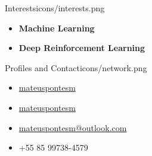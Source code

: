\documentclass{thepurplecv}
\begin{document}
\begin{purplesectionright}{Interests}{icons/interests.png}
{
\begin{itemize}[leftmargin=0cm,align=left]
    \item[] \textbf{Machine Learning}
    \item[] \textbf{Deep Reinforcement Learning}
\end{itemize}
}
\end{purplesectionright}

\begin{purplesectionleft}{Profiles and Contact}{icons/network.png}
{
\begin{itemize}[leftmargin=0cm,align=left]
\item[] \faGithub \hspace*{10pt} \href{https://github.com/mateuspontesm/}{mateuspontesm}
\item[] \faLinkedin \hspace*{10pt} \href{https://www.linkedin.com/in/mateuspontesm/}{mateuspontesm}
\item[] \faEnvelope \hspace*{10pt} \href{mateuspontesm@outlook.com}{mateuspontesm@outlook.com}
\item[] \faPhone \hspace*{10pt} +55 85 99738-4579
\end{itemize}
}
\end{purplesectionleft}

\end{document}
